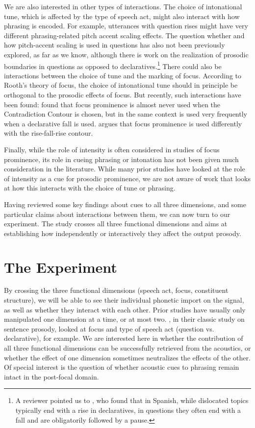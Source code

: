 \documentclass[preprint,review,12pt,authoryear,times]{elsarticle}
\begin{document}
We are also interested in other types of interactions. The choice of intonational tune, which is affected by the type of speech act, might also interact with how phrasing is encoded. For example, utterances with question rises might have very different phrasing-related pitch accent scaling effects.  The question whether and how pitch-accent scaling is used in questions has also not been previously explored, as far as we know, although there is work on the realization of prosodic boundaries in questions as opposed to declaratives.\footnote{A reviewer pointed us to \citet{feldh16}, who found that in Spanish, while dislocated topics typically end with a rise in declaratives, in questions they often end with a fall and are obligatorily followed by a pause.}  There could also be interactions between the choice of tune and the marking of focus. According to Rooth's theory of focus, the choice of intonational tune should in principle be orthogonal to the prosodic effects of focus. But recently, such interactions have been found:  \citep{goodhueetal16} found that focus prominence is almost never used when the Contradiction Contour is chosen, but in the same context is used very frequently when a declarative fall is used. \citet{schlo18} argues that focus prominence is used differently with the rise-fall-rise contour. 

Finally, while the role of intensity is often considered in studies of focus prominence, its role in cueing phrasing or intonation has not been given much consideration in the literature. While many prior studies have looked at the role of intensity as a cue for prosodic prominence, we are not aware of work that looks at how this interacts with the choice of tune or phrasing. 

Having reviewed some key findings about cues to all three dimensions, and some particular claims about interactions between them, we can now turn to our experiment. The study crosses all three functional dimensions and aims at establishing how independently or interactively they affect the output prosody.


\section{The Experiment}
\label{experiment}

By crossing the three functional dimensions  (speech act, focus, constituent structure), we will be able to see their individual phonetic import on the signal, as well as whether they interact with each other. Prior studies have usually only manipulated one dimension at a time, or at most two.  \citet{eady86}, in their classic study on sentence prosody, looked at focus and type of speech act (question vs. declarative), for example. We are interested here in whether the contribution of all three functional dimensions can be successfully retrieved from the acoustics, or whether the effect of one dimension sometimes neutralizes the effects of the other. Of special interest is the question of whether acoustic cues to phrasing remain intact in the post-focal domain. 
\end{document}
